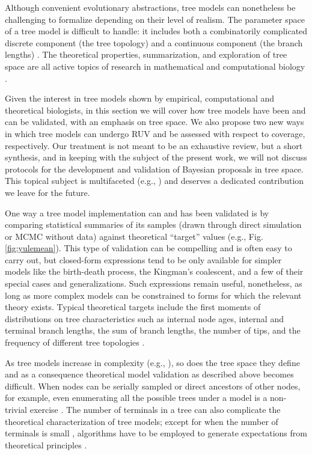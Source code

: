 \documentclass[oneside]{article}
\begin{document}
Although convenient evolutionary abstractions, tree models can nonetheless be challenging to formalize depending on their level of realism.
The parameter space of a tree model is difficult to handle: it includes both a combinatorily complicated discrete component (the tree topology) and a continuous component (the branch lengths) \citep{semple03}.
The theoretical properties, summarization, and exploration of tree space are all active topics of research in mathematical and computational biology \citep{gavryushkina13,gavryushkin16,brown20}.

Given the interest in tree models shown by empirical, computational and theoretical biologists, in this section we will cover how tree models have been and can be validated, with an emphasis on tree space.
We also propose two new ways in which tree models can undergo RUV and be assessed with respect to coverage, respectively.
Our treatment is not meant to be an exhaustive review, but a short synthesis, and in keeping with the subject of the present work, we will not discuss protocols for the development and validation of Bayesian proposals in tree space.
This topical subject is multifaceted (e.g., \citealp{douglas21,bouckaert22,douglas22}) and deserves a dedicated contribution we leave for the future.

One way a tree model implementation can and has been validated is by comparing statistical summaries of its samples (drawn through direct simulation or MCMC without data) against theoretical ``target'' values (e.g., Fig. \ref{fig:yulemean}).
This type of validation can be compelling and is often easy to carry out, but closed-form expressions tend to be only available for simpler models like the birth-death process, the Kingman's coalescent, and a few of their special cases and generalizations.
Such expressions remain useful, nonetheless, as long as more complex models can be constrained to forms for which the relevant theory exists.
Typical theoretical targets include the first moments of distributions on tree characteristics such as internal node ages, internal and terminal branch lengths, the sum of branch lengths, the number of tips, and the frequency of different tree topologies \citep{tj83,rosenberg02,aldous05,nee06,gernhard06,gernhard08,wakeley09,mooers12}.

As tree models increase in complexity (e.g., \citealp{maddison07,goldberg12,fitzjohn10,scire22}), so does the tree space they define and as a consequence theoretical model validation as described above becomes difficult.
When nodes can be serially sampled or direct ancestors of other nodes, for example, even enumerating all the possible trees under a model is a non-trivial exercise \citep{gavryushkina13}. 
The number of terminals in a tree can also complicate the theoretical characterization of tree models; except for when the number of terminals is small \citep{beast2book}, algorithms have to be employed to generate expectations from theoretical principles \citep{kim19}.
\end{document}
